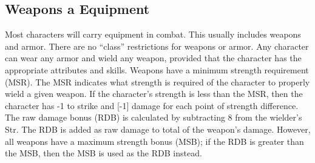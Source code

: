 \documentclass[twoside]{book}
\begin{document}
\subsection{Weapons a Equipment}
     Most characters will carry equipment in combat. This
               usually includes weapons and armor. There are no
               “class” restrictions for weapons or armor. Any
               character can wear any armor and wield any weapon,
               provided that the character has the appropriate attributes
               and skills.  Weapons have a minimum strength requirement (MSR).
               The MSR indicates what strength is required of the
               character to properly wield a given weapon. If the
               character’s strength is less than the MSR, then the
               character has -1 to strike and [-1] damage for each point
               of strength difference.  The raw damage bonus (RDB) is calculated by
               subtracting 8 from the wielder’s Str. The RDB is
               added as raw damage to total of the weapon’s damage.
               However, all weapons have a maximum strength bonus (MSB);
               if the RDB is greater than the MSB, then the MSB is used
               as the RDB instead. 
  
\end{document}

